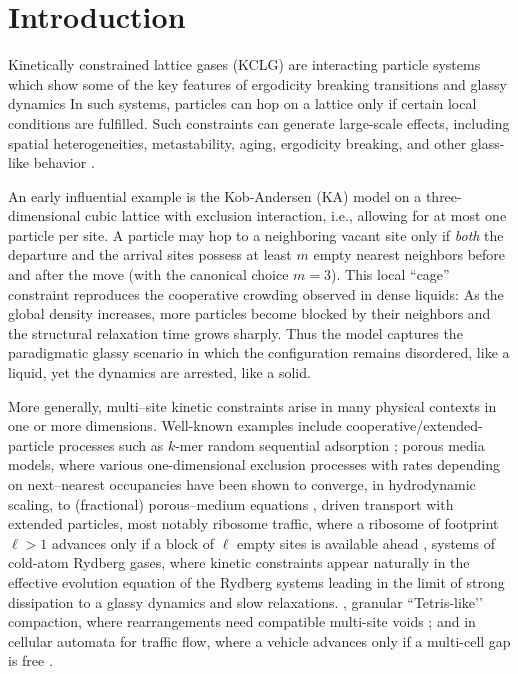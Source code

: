 \documentclass[pdflatex,sn-mathphys-num]{sn-jnl}
\theoremstyle{definition}
\theoremstyle{remark}
\numberwithin{equation}{section}
\begin{document}
\section{Introduction}
Kinetically constrained lattice gases (KCLG) are interacting particle systems
which show some of the key features of ergodicity breaking transitions and glassy dynamics \cite{helbing2000simulating}
In such systems, particles can hop on a lattice only if certain local conditions are fulfilled. Such constraints can generate large-scale effects, including spatial heterogeneities, metastability, aging, ergodicity breaking, and other glass-like behavior \cite{ritort2003glassy,garrahan2011kinetically}.


An early influential example is the  Kob-Andersen (KA) model on a three-dimensional cubic lattice \cite{kob1993kinetic} with exclusion interaction, i.e., allowing for at most one particle per site. 
A particle may hop to a neighboring vacant site only if {\it both} the departure and the arrival sites possess at least \(m\) empty nearest neighbors  before and  after the move (with the canonical choice \(m=3\)). 
This local “cage” constraint reproduces the cooperative crowding observed in dense liquids: As the global density increases, more particles become blocked by their neighbors and the structural relaxation time grows sharply. 
Thus the model captures the paradigmatic glassy scenario in which the configuration remains disordered, like a liquid, yet the dynamics are arrested, like a solid.

More generally, multi–site kinetic constraints arise in many physical contexts in one or more dimensions. Well-known examples include cooperative/extended-particle processes such as \(k\)-mer random sequential adsorption \cite{evans1993random}; porous media models, where various one-dimensional exclusion processes with rates depending on next–nearest occupancies have been shown to converge, in hydrodynamic scaling, to (fractional) porous–medium equations \cite{GoncalvesLandimToninelli2009,Goncalves2011,CardosoGoncalves2024}, driven transport with extended particles, most notably ribosome traffic, where a ribosome of footprint \(\ell>1\) advances only if a block of \(\ell\) empty sites is available ahead \cite{macdonald1968biopolymers,Schu97a,Laka03,shaw2003totally,chou2011rpp}, systems of cold-atom Rydberg gases, where kinetic constraints appear naturally in
the effective evolution equation of the Rydberg systems leading in the limit of strong dissipation to a glassy dynamics and slow relaxations.
\cite{lesanovsky2013kinetic_constraints,valado2016constraints}, granular “Tetris-like’’ compaction, where rearrangements need compatible multi-site voids \cite{caglioti1997tetris}; and in cellular automata for traffic flow, where a vehicle advances only if a multi-cell gap is free \cite{nagel1992traffic}.
\end{document}
